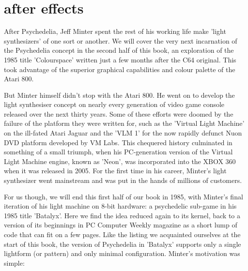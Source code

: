 \chapter{after effects} 
\label{sec:patterns}
\lstset{style=6502Style}
\lstset{ 
   aboveskip=5pt,
   belowskip=0pt,
}
After Psychedelia, Jeff Minter spent the rest of his working life make 'light synthesizers' of one sort or another. We will cover the very next incarnation of the
Psychedelia concept in the second half of this book, an exploration of the 1985 title 'Colourspace' written just a few months after the C64 original. This
took advantage of the superior graphical capabilities and colour palette of the Atari 800. 

But Minter himself didn't stop with the Atari 800. He went on to develop the light
synthesiser concept on nearly every generation of video game console released
over the next thirty years. Some of these efforts were doomed by the failure of
the platform they were written for, such as the 'Virtual Light Machine' on the
ill-fated Atari Jaguar and the 'VLM 1' for the now rapidly defunct Nuon DVD platform developed by
VM Labs. This chequered history culminated in something of a small triumph, when his PC-generation version of the Virtual Light Machine engine, known as 'Neon',
was incorporated into the XBOX 360 when it was released in 2005. For the first time in his career, Minter's light synthesizer went mainstream and was put in the
hands of millions of customers.

For us though, we will end this first half of our book in 1985, with Minter's final iteration of his light machine on 8-bit hardware: a psychedelic sub-game in his 1985 title 'Batalyx'. Here
we find the idea reduced again to its kernel, back to a version of its beginnings in PC Computer Weekly magazine as a short lump of code that can fit on a few pages.
Like the listing we acquainted ourselves at the start of this book, the version of Psychedelia in 'Batalyx' supports only a single lightform (or pattern) and only
minimal configuration. Minter's motivation was simple:



